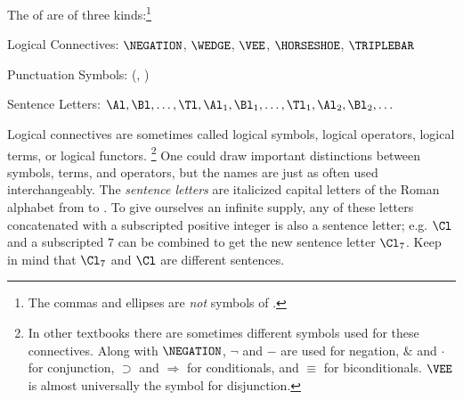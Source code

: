 \begin{majorILnc}{} The  of \GSL{} are of three kinds:\footnote{The commas and ellipses are \emph{not} symbols of \GSL{}.}
\begin{cenumerate}
\item Logical Connectives: $\NEGATION$, $\WEDGE$, $\VEE$, $\HORSESHOE$, $\TRIPLEBAR$
\item Punctuation Symbols: (, )
\item Sentence Letters: $\Al,\Bl, \ldots, \Tl, \Al_1,\Bl_1, \ldots, \Tl_1, \Al_2, \Bl_2, \ldots$  
\end{cenumerate}
\end{majorILnc} 
\noindent{}Logical connectives are sometimes called logical symbols, logical operators, logical terms, or logical functors.%
\footnote{%
In other textbooks there are sometimes different symbols used for these connectives. 
Along with $\NEGATION$, $\neg$ and $-$ are used for negation, $\&$ and $\cdot$ for conjunction, $\supset$ and $\Rightarrow$ for conditionals, and $\equiv$ for biconditionals. $\VEE$ is almost universally the symbol for disjunction.
} 
One could draw important distinctions between symbols, terms, and operators, but the names are just as often used interchangeably.
The \emph{sentence letters} are italicized capital letters of the Roman alphabet from \mention{$\Al$} to \mention{$\Tl$}.  To give ourselves an infinite supply, any of these letters concatenated with a subscripted positive integer is also a sentence letter; e.g. $\Cl$ and a subscripted $7$ can be combined to get the new sentence letter $\Cl_7$. Keep in mind that $\Cl_7$ and $\Cl$ are different sentences.


